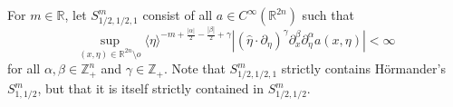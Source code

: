 \documentclass{amsart}
\newcommand {\con}{M}
\newcommand {\ud}{\mathrm{d}}
\newcommand {\rb}{\rangle}
\newcommand {\lb}{\langle}
\newcommand {\R}{\mathbb R}
\newcommand {\Rn}{\mathbb{R}^{n}}
\newcommand {\Sw}{\mathcal{S}}
\newcommand {\wh}{\widehat}
\newcommand {\Z}{\mathbb Z}
\theoremstyle{definition}
\numberwithin{equation}{section}
\begin{document}

For $m\in\R$, let $S^{m}_{1/2,1/2,1}$ consist of all $a\in C^{\infty}(\R^{2n})$ such that 
\[
\sup_{(x,\eta)\in\R^{2n}\setminus o}\lb\eta\rb^{-m+\frac{|\alpha|}{2}-\frac{|\beta|}{2}+\gamma}|(\hat{\eta}\cdot\partial_{\eta})^{\gamma}\partial_{x}^{\beta}\partial_{\eta}^{\alpha}a(x,\eta)|<\infty
\]
for all $\alpha,\beta\in\Z_{+}^{n}$ and $\gamma\in\Z_{+}$. Note that $S^{m}_{1/2,1/2,1}$ strictly contains H\"{o}rmander's %
$S^{m}_{1,1/2}$, but that it is itself strictly contained in $S^{m}_{1/2,1/2}$.
\end{document}
